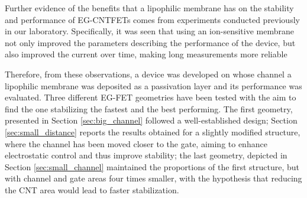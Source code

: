 Further evidence of the benefits that a lipophilic membrane has on the stability and performance of EG-CNTFETs comes from experiments conducted previously in our laboratory. Specifically, it was seen that using an ion-sensitive membrane not only improved the parameters describing the performance of the device, but also improved the current over time, making long measurements more reliable \citep{petrelliFlexible2022,petrelliNovel2022,petrelliMethod2023}

Therefore, from these observations, a device was developed on whose channel a lipophilic membrane was deposited as a passivation layer and its performance was evaluated. Three different EG-FET geometries have been tested with the aim to find the one stabilizing the fastest and the best performing. The first geometry, presented in Section \ref{sec:big_channel} followed a well-established design; Section \ref{sec:small_distance} reports the results obtained for a slightly modified structure, where the channel has been moved closer to the gate, aiming to enhance electrostatic control and thus improve stability; the last geometry, depicted in Section \ref{sec:small_channel} maintained the proportions of the first structure, but with channel and gate areas four times smaller, with the hypothesis that reducing the CNT area would lead to faster stabilization.